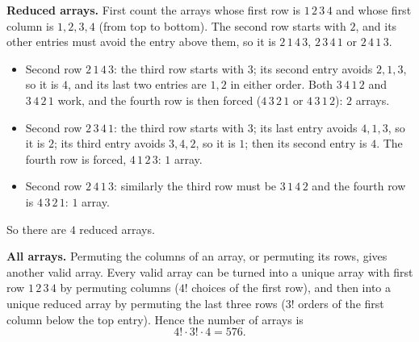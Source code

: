 \textbf{Reduced arrays.} First count the arrays whose first row is $1\,2\,3\,4$ and whose first column is $1,2,3,4$ (from top to bottom). The second row starts with $2$, and its other entries must avoid the entry above them, so it is $2\,1\,4\,3$, $2\,3\,4\,1$ or $2\,4\,1\,3$.
\begin{itemize}
\item Second row $2\,1\,4\,3$: the third row starts with $3$; its second entry avoids $2,1,3$, so it is $4$, and its last two entries are $1,2$ in either order. Both $3\,4\,1\,2$ and $3\,4\,2\,1$ work, and the fourth row is then forced ($4\,3\,2\,1$ or $4\,3\,1\,2$): $2$ arrays.
\item Second row $2\,3\,4\,1$: the third row starts with $3$; its last entry avoids $4,1,3$, so it is $2$; its third entry avoids $3,4,2$, so it is $1$; then its second entry is $4$. The fourth row is forced, $4\,1\,2\,3$: $1$ array.
\item Second row $2\,4\,1\,3$: similarly the third row must be $3\,1\,4\,2$ and the fourth row is $4\,3\,2\,1$: $1$ array.
\end{itemize}
So there are $4$ reduced arrays.

\textbf{All arrays.} Permuting the columns of an array, or permuting its rows, gives another valid array. Every valid array can be turned into a unique array with first row $1\,2\,3\,4$ by permuting columns ($4!$ choices of the first row), and then into a unique reduced array by permuting the last three rows ($3!$ orders of the first column below the top entry). Hence the number of arrays is
\[4!\cdot3!\cdot4=\boxed{576}.\]
